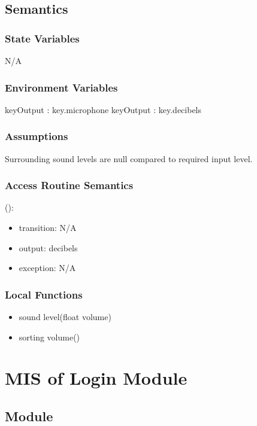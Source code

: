 \documentclass[12pt, titlepage]{article}
\begin{document}
\subsection{Semantics}

\subsubsection{State Variables}

N/A

\subsubsection{Environment Variables}

keyOutput : {key.microphone}
keyOutput : {key.decibels}

\subsubsection{Assumptions}

Surrounding sound levels are null compared to required input level.

\subsubsection{Access Routine Semantics}

\noindent {}():
\begin{itemize}
\item transition: N/A 
\item output: decibels
\item exception: N/A
\end{itemize}

\subsubsection{Local Functions}
\begin{itemize}
\item sound level(float volume)
\item sorting volume()
\end{itemize}



\section{MIS of Login Module} \label{Login Module}

\subsection{Module}
\end{document}
